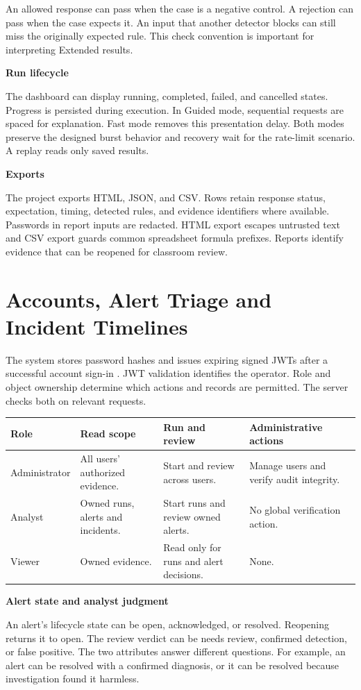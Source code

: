 \documentclass[11pt,letterpaper,oneside]{report}
\newcommand{\topic}[1]{\smallskip\noindent\textbf{#1}\par\nobreak\vspace{-.39em}}
\newcommand{\sheet}[1]{\clearpage\section{#1}}
\newcommand{\tabletitle}[1]{\captionof{table}{#1}\smallskip}
\begin{document}
An allowed response can pass when the case is a negative control. A rejection can pass when the case expects it. An input that another detector blocks can still miss the originally expected rule. This check convention is important for interpreting Extended results.

\topic{Run lifecycle}
The dashboard can display running, completed, failed, and cancelled states. Progress is persisted during execution. In Guided mode, sequential requests are spaced for explanation. Fast mode removes this presentation delay. Both modes preserve the designed burst behavior and recovery wait for the rate-limit scenario. A replay reads only saved results.

\topic{Exports}
The project exports HTML, JSON, and CSV. Rows retain response status, expectation, timing, detected rules, and evidence identifiers where available. Passwords in report inputs are redacted. HTML export escapes untrusted text and CSV export guards common spreadsheet formula prefixes. Reports identify evidence that can be reopened for classroom review.

\sheet{Accounts, Alert Triage and Incident Timelines}
The system stores password hashes and issues expiring signed JWTs after a successful account sign-in \cite{jwt}. JWT validation identifies the operator. Role and object ownership determine which actions and records are permitted. The server checks both on relevant requests.

\tabletitle{Role matrix for the project workflow}
\begin{tabularx}{\linewidth}{@{}lYYY@{}}\toprule
\textbf{Role} & \textbf{Read scope} & \textbf{Run and review} & \textbf{Administrative actions}\\\midrule
Administrator & All users' authorized evidence. & Start and review across users. & Manage users and verify audit integrity.\\
Analyst & Owned runs, alerts and incidents. & Start runs and review owned alerts. & No global verification action.\\
Viewer & Owned evidence. & Read only for runs and alert decisions. & None.\\
\bottomrule\end{tabularx}

\topic{Alert state and analyst judgment}
An alert's lifecycle state can be open, acknowledged, or resolved. Reopening returns it to open. The review verdict can be needs review, confirmed detection, or false positive. The two attributes answer different questions. For example, an alert can be resolved with a confirmed diagnosis, or it can be resolved because investigation found it harmless.
\end{document}
